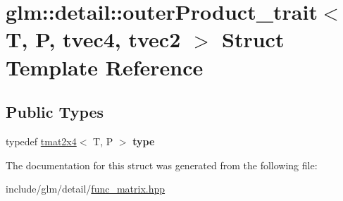 \hypertarget{structglm_1_1detail_1_1outerProduct__trait_3_01T_00_01P_00_01tvec4_00_01tvec2_01_4}{}\section{glm\+:\+:detail\+:\+:outer\+Product\+\_\+trait$<$ T, P, tvec4, tvec2 $>$ Struct Template Reference}
\label{structglm_1_1detail_1_1outerProduct__trait_3_01T_00_01P_00_01tvec4_00_01tvec2_01_4}
\subsection*{Public Types}
\begin{DoxyCompactItemize}
\item 
\mbox{\label{structglm_1_1detail_1_1outerProduct__trait_3_01T_00_01P_00_01tvec4_00_01tvec2_01_4_a7ba36562a91885d8d627ad39436b237e}} 
typedef \hyperlink{structglm_1_1tmat2x4}{tmat2x4}$<$ T, P $>$ {\bfseries type}
\end{DoxyCompactItemize}


The documentation for this struct was generated from the following file\+:\begin{DoxyCompactItemize}
\item 
include/glm/detail/\hyperlink{func__matrix_8hpp}{func\+\_\+matrix.\+hpp}\end{DoxyCompactItemize}
